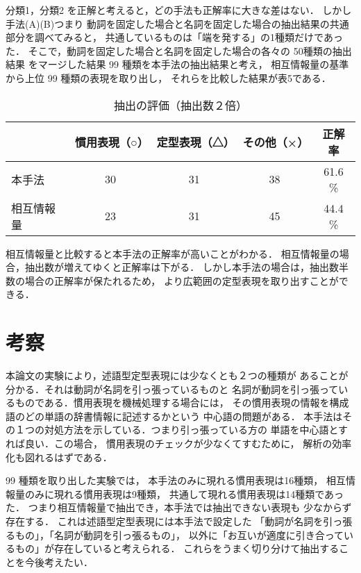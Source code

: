 分類1，分類2 を正解と考えると，どの手法も正解率に大きな差はない．
しかし手法(A)(B)つまり
動詞を固定した場合と名詞を固定した場合の抽出結果の共通部分を調べてみると，
共通しているものは「端を発する」の1種類だけであった．
そこで，動詞を固定した場合と名詞を固定した場合の各々の 50種類の抽出結果
をマージした結果 99 種類を本手法の抽出結果と考え，
相互情報量の基準から上位 99 種類の表現を取り出し，
それらを比較した結果が表5である．


\begin{table}[htbp]
  \begin{center}
    \begin{tabular}{|l||c|c|c|c|} \hline
           &  慣用表現（○）  & 定型表現（△）& その他（×）&  正解率 \\  \hline \hline
本手法     &   30       &       31      &   38        &   61.6 \%  \\ \hline
相互情報量 &   23       &       31      &   45        &   44.4 \%  \\ \hline
    \end{tabular}
  \end{center}
  \caption{抽出の評価（抽出数２倍）}
\end{table}

相互情報量と比較すると本手法の正解率が高いことがわかる．
相互情報量の場合，抽出数が増えてゆくと正解率は下がる．
しかし本手法の場合は，抽出数半数の場合の正解率が保たれるため，
より広範囲の定型表現を取り出すことができる．


\section{考察}

  本論文の実験により，述語型定型表現には少なくとも２つの種類が
あることが分かる．それは動詞が名詞を引っ張っているものと
名詞が動詞を引っ張っているものである．慣用表現を機械処理する場合には，
その慣用表現の情報を構成語のどの単語の辞書情報に記述するかという
中心語の問題がある．
本手法はその１つの対処方法を示している．つまり引っ張っている方の
単語を中心語とすれば良い．この場合，
慣用表現のチェックが少なくてすむために，
解析の効率化も図れるはずである．

  99 種類を取り出した実験では，
本手法のみに現れる慣用表現は16種類，
相互情報量のみに現れる慣用表現は9種類，
共通して現れる慣用表現は14種類であった．
つまり相互情報量で抽出でき，本手法では抽出できない表現も
少なからず存在する．
これは述語型定型表現には本手法で設定した
「動詞が名詞を引っ張るもの」，「名詞が動詞を引っ張るもの」，
以外に「お互いが適度に引き合っているもの」が存在していると考えられる．
これらをうまく切り分けて抽出することを今後考えたい．

